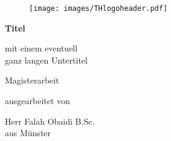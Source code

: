 \begin{titlepage}

\begin{center}

\begin{figure}[!ht]
		\texttt{[image: images/THlogoheader.pdf]}
\end{figure}

\vspace{0.4cm}

\begin{rmfamily}
\begin{huge}
\textbf{Titel}\\	
\end{huge}
\vspace{0.5cm}
\begin{LARGE}
mit einem eventuell\\ganz langen Untertitel\\
\end{LARGE}
\end{rmfamily}

\vspace{0.8cm}



\begin{LARGE}
\begin{scshape}
Magisterarbeit\\[0.8em]
\end{scshape}
\end{LARGE}

\begin{large}
ausgearbeitet von\\ 
\vspace{0.3cm}
\begin{LARGE}
Herr Falah Obaidi B.Sc.\\
aus Münster\\[0.8]
\end{LARGE}
\end{large}


\end{center}
\end{titlepage}
